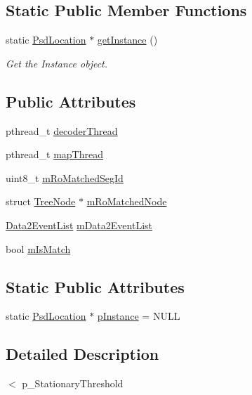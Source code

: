 \subsection*{Static Public Member Functions}
\begin{DoxyCompactItemize}
\item 
static \hyperlink{class_psd_location}{Psd\+Location} $\ast$ \hyperlink{class_psd_location_a0ec04eadcec725922d8413aa59d3cb07}{get\+Instance} ()
\begin{DoxyCompactList}\small\item\em Get the Instance object. \end{DoxyCompactList}\end{DoxyCompactItemize}
\subsection*{Public Attributes}
\begin{DoxyCompactItemize}
\item 
pthread\+\_\+t \hyperlink{class_psd_location_a5d7bd3fa135b850706b5e84ae7030e42}{decoder\+Thread}
\item 
pthread\+\_\+t \hyperlink{class_psd_location_a27cc6052f8ad1d5275665eeffcf4e27a}{map\+Thread}
\item 
uint8\+\_\+t \hyperlink{class_psd_location_a58e1c30caca2156e789630b0daf02119}{m\+Ro\+Matched\+Seg\+Id}
\item 
struct \hyperlink{struct_tree_node}{Tree\+Node} $\ast$ \hyperlink{class_psd_location_ab7c279e371a3c0769393213a100b2f97}{m\+Ro\+Matched\+Node}
\item 
\hyperlink{_psd_location_8h_a61af0449f917913c902b37ed397eb350}{Data2\+Event\+List} \hyperlink{class_psd_location_aed2837439f815776affee635d3cb5e51}{m\+Data2\+Event\+List}
\item 
bool \hyperlink{class_psd_location_a7a61732e0ce265903e9b361afac2bcea}{m\+Is\+Match}
\end{DoxyCompactItemize}
\subsection*{Static Public Attributes}
\begin{DoxyCompactItemize}
\item 
static \hyperlink{class_psd_location}{Psd\+Location} $\ast$ \hyperlink{class_psd_location_a65504484bcffebd2f8a95cf7d5b26f2d}{p\+Instance} = N\+U\+LL
\end{DoxyCompactItemize}


\subsection{Detailed Description}
$<$ p\+\_\+\+Stationary\+Threshold 

